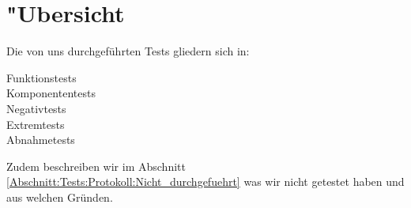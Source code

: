 %



\section{{"U}bersicht}
\label{Abschnitt:Tests:Uebersicht}

Die von uns durchgeführten Tests gliedern sich in:

\begin{description} %

	\item[Funktionstests]
	\item[Komponententests]
	\item[Negativtests]
	\item[Extremtests]
	\item[Abnahmetests]

\end{description}

Zudem beschreiben wir im Abschnitt \ref{Abschnitt:Tests:Protokoll:Nicht_durchgefuehrt} was wir nicht getestet haben und aus welchen Gründen.








